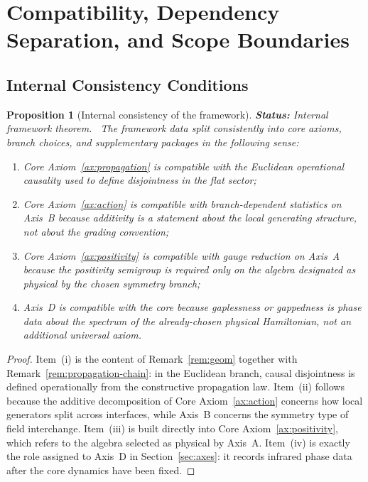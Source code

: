 \documentclass[12pt,a4paper]{article}
\theoremstyle{plain}
\newtheorem{proposition}[theorem]{Proposition}
\theoremstyle{definition}
\theoremstyle{remark}
\newcommand{\status}[1]{\textnormal{\textbf{Status:} #1.}\ }
\begin{document}
\section{Compatibility, Dependency Separation, and Scope Boundaries}
\label{sec:compatibility}

\subsection{Internal Consistency Conditions}

\begin{proposition}[Internal consistency of the framework]
  \label{prop:internal-consistency}
  \status{Internal framework theorem}
  The framework data split consistently into core axioms, branch
  choices, and supplementary packages in the following sense:
  \begin{enumerate}[nosep,label=(\roman*)]
  \item Core Axiom~\ref{ax:propagation} is compatible with the
    Euclidean operational causality used to define disjointness in the
    flat sector;
  \item Core Axiom~\ref{ax:action} is compatible with branch-dependent
    statistics on Axis~B because additivity is a statement about the
    local generating structure, not about the grading convention;
  \item Core Axiom~\ref{ax:positivity} is compatible with gauge
    reduction on Axis~A because the positivity semigroup is required
    only on the algebra designated as physical by the chosen symmetry
    branch;
  \item Axis~D is compatible with the core because gaplessness or
    gappedness is phase data about the spectrum of the already-chosen
    physical Hamiltonian, not an additional universal axiom.
  \end{enumerate}
\end{proposition}
\begin{proof}
  Item~(i) is the content of Remark~\ref{rem:geom} together with
  Remark~\ref{rem:propagation-chain}: in the Euclidean branch, causal
  disjointness is defined operationally from the constructive
  propagation law. Item~(ii) follows because the additive decomposition
  of Core Axiom~\ref{ax:action} concerns how local generators split
  across interfaces, while Axis~B concerns the symmetry type of field
  interchange. Item~(iii) is built directly into
  Core Axiom~\ref{ax:positivity}, which refers to the algebra selected
  as physical by Axis~A. Item~(iv) is exactly the role assigned to
  Axis~D in Section~\ref{sec:axes}: it records infrared phase data
  after the core dynamics have been fixed.
\end{proof}
\end{document}

